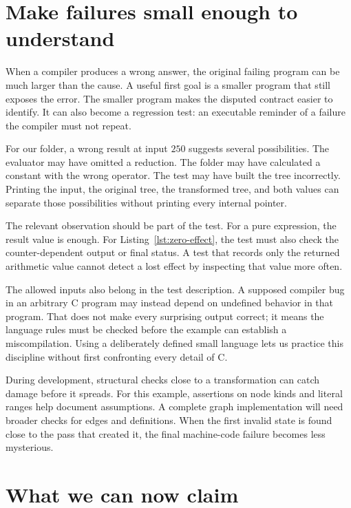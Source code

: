 \section{Make failures small enough to understand}
\label{sec:compiler-failure-method}

When a compiler produces a wrong answer, the original failing program can be much larger than the cause.
A useful first goal is a smaller program that still exposes the error.
The smaller program makes the disputed contract easier to identify.
It can also become a regression test: an executable reminder of a failure the compiler must not repeat.

For our folder, a wrong result at input $250$ suggests several possibilities.
The evaluator may have omitted a reduction.
The folder may have calculated a constant with the wrong operator.
The test may have built the tree incorrectly.
Printing the input, the original tree, the transformed tree, and both values can separate those possibilities without printing every internal pointer.

The relevant observation should be part of the test.
For a pure expression, the result value is enough.
For Listing~\ref{lst:zero-effect}, the test must also check the counter-dependent output or final status.
A test that records only the returned arithmetic value cannot detect a lost effect by inspecting that value more often.

The allowed inputs also belong in the test description.
A supposed compiler bug in an arbitrary C program may instead depend on undefined behavior in that program.
That does not make every surprising output correct; it means the language rules must be checked before the example can establish a miscompilation.
Using a deliberately defined small language lets us practice this discipline without first confronting every detail of C.

During development, structural checks close to a transformation can catch damage before it spreads.
For this example, assertions on node kinds and literal ranges help document assumptions.
A complete graph implementation will need broader checks for edges and definitions.
When the first invalid state is found close to the pass that created it, the final machine-code failure becomes less mysterious.





\section{What we can now claim}
\label{sec:first-chapter-checkpoint}

